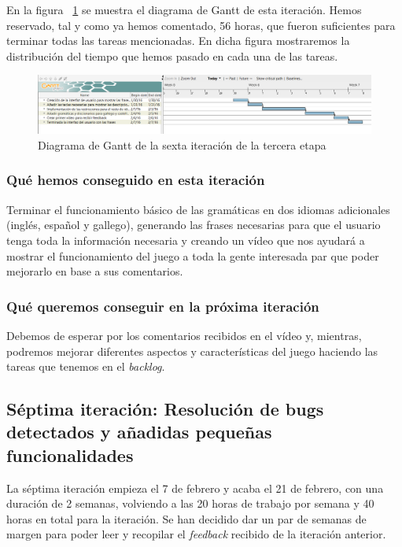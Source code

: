 En la figura ~\ref{fig:sec3it6} se muestra el diagrama de Gantt de esta iteración. Hemos reservado, tal y como ya hemos comentado, 56 horas, que fueron suficientes para terminar todas las tareas mencionadas. En dicha figura mostraremos la distribución del tiempo que hemos pasado en cada una de las tareas.

\begin{figure}
    \includegraphics[width=\textwidth,height=\textheight,keepaspectratio]{./img/sec3it6.png}
  \caption{Diagrama de Gantt de la sexta iteración de la tercera etapa}
  \label{fig:sec3it6}
\end{figure}

\subsubsection{Qué hemos conseguido en esta iteración}

Terminar el funcionamiento básico de las gramáticas en dos idiomas adicionales (inglés, español y gallego), generando las frases necesarias para que el usuario tenga toda la información necesaria y creando un vídeo que nos ayudará a mostrar el funcionamiento del juego a toda la gente interesada par que poder mejorarlo en base a sus comentarios.

\subsubsection{Qué queremos conseguir en la próxima iteración}

Debemos de esperar por los comentarios recibidos en el vídeo y, mientras, podremos mejorar diferentes aspectos y características del juego haciendo las tareas que tenemos en el \textit{backlog}.

\subsection{Séptima iteración: Resolución de bugs detectados y añadidas pequeñas funcionalidades}

La séptima iteración empieza el 7 de febrero y acaba el 21 de febrero, con una duración de 2 semanas, volviendo a las 20 horas de trabajo por semana y 40 horas en total para la iteración. Se han decidido dar un par de semanas de margen para poder leer y recopilar el \textit{feedback} recibido de la iteración anterior.

